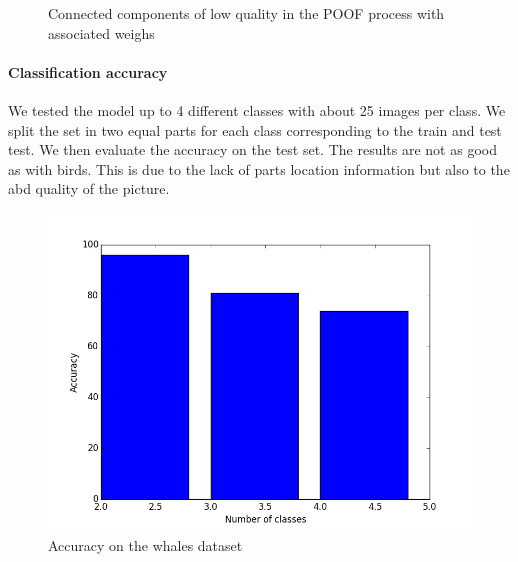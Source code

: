 \documentclass[twoside]{article}
\begin{document}
\begin{multicols}{2}
\begin{figure}[H]
{}
\quad
{}
\caption{Connected components of low quality in the POOF process with associated weighs}
\label{fig:fig_std}
\end{figure}

\paragraph{Classification accuracy}

We tested the model up to 4 different classes with about 25 images per class. We split the set in two equal parts for each class corresponding to the train and test test. We then evaluate the accuracy on the test set. The results are not as good as with birds. This is due to the lack of parts location information but also to the abd quality of the picture.

\begin{figure}[H]
	\includegraphics[scale=0.35]{img/acc_w.png}
	\centering
	\caption{Accuracy on the whales dataset}
\end{figure}




\end{multicols}
\end{document}
